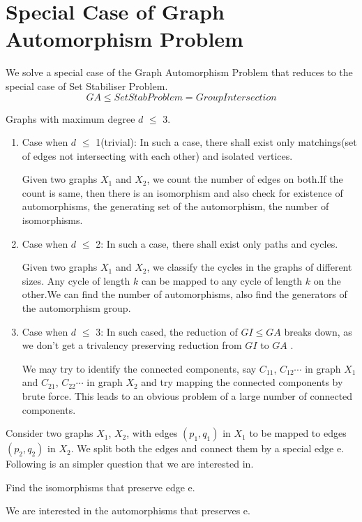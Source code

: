 \section{Special Case of Graph Automorphism Problem}
We solve a special case of the Graph Automorphism Problem that reduces to the special case of Set Stabiliser Problem. 
\[ GA \leqslant SetStab Problem = Group Intersection \]
\begin{definition} Graphs with maximum degree $d$ $\leqslant$ 3.
\end{definition}
\begin{enumerate}
	\item Case when $d$ $\leqslant$ 1(trivial): 
	In such a case, there shall exist only matchings(set of edges not intersecting with each other) and isolated vertices. 
	
	Given two graphs $X_1$ and $X_2$, we count the number of edges on both.If the count is same, then there is an isomorphism and also check for existence of automorphisms, the generating set of the automorphism, the number of isomorphisms.
	\item Case when $d$ $\leqslant$ 2:
	In such a case, there shall exist only paths and cycles.
	
	Given two graphs $X_1$ and $X_2$, we classify the cycles in the graphs of different sizes. Any cycle of length $k$ can be mapped to any cycle of length $k$ on the other.We can find the number of automorphisms, also find the generators of the automorphism group.
	\item Case when $d$ $\leqslant$ 3:
	In such cased, the reduction of $GI \leqslant GA$ breaks down, as we don't get a trivalency preserving reduction from $GI$ to $GA$ .
	
	We may try to identify the connected components, say $C_{11}$, $C_{12}\cdots$ in graph $X_1$ and $C_{21}$, $C_{22} \cdots$ in graph $X_2$ and try mapping the connected components by brute force. This leads to an obvious problem of a large number of connected components.	 
\end{enumerate}	



Consider two graphs $X_1$, $X_2$, with edges $(p_1,q_1)$ in $X_1$ to be mapped to edges $(p_2,q_2)$ in $X_2$. We split both the edges and connect them by a special edge e. Following is an simpler question that we are interested in.
\begin{problem} Find the isomorphisms that preserve edge e.
\end{problem}
We are interested in the automorphisms that preserves e. 

